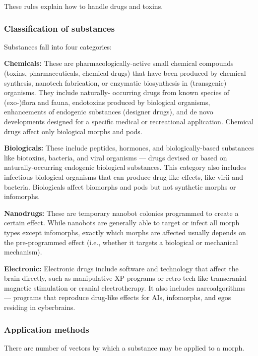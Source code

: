 These rules explain how to handle drugs and toxins. 

\subsubsection{Classification of substances} 

Substances fall into four categories: 

\textbf{Chemicals:} These are pharmacologically-active small chemical compounds (toxins, pharmaceuticals, chemical drugs) that have been produced by chemical synthesis, nanotech fabrication, or enzymatic biosynthesis in (transgenic) organisms. They include naturally- occurring drugs from known species of (exo-)flora and fauna, endotoxins produced by biological organisms, enhancements of endogenic substances (designer drugs), and de novo developments designed for a specific medical or recreational application. Chemical drugs affect only biological morphs and pods. 

\textbf{Biologicals:} These include peptides, hormones, and biologically-based substances like biotoxins, bacteria, and viral organisms --- drugs devised or based on naturally-occurring endogenic biological substances. This category also includes infectious biological organisms that can produce drug-like effects, like virii and bacteria. Biologicals affect biomorphs and pods but not synthetic morphs or infomorphs. 

\textbf{Nanodrugs:} These are temporary nanobot colonies programmed to create a certain effect. While nanobots are generally able to target or infect all morph types except infomorphs, exactly which morphs are affected usually depends on the pre-programmed effect (i.e., whether it targets a biological or mechanical mechanism). 

\textbf{Electronic:} Electronic drugs include software and technology that affect the brain directly, such as manipulative XP programs or retro-tech like transcranial magnetic stimulation or cranial electrotherapy. It also includes narcoalgorithms --- programs that reproduce drug-like effects for AIs, infomorphs, and egos residing in cyberbrains. 

\subsubsection{Application methods} 

There are number of vectors by which a substance may be applied to a morph. 

